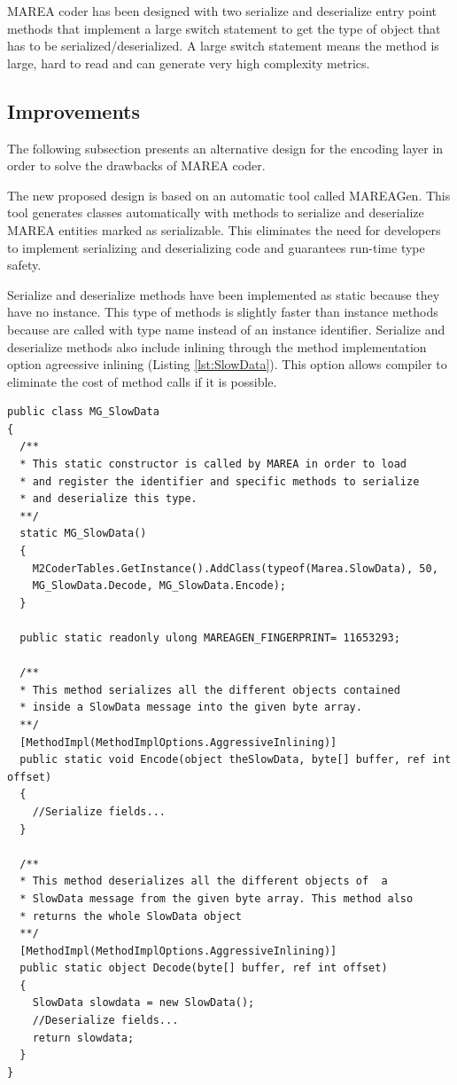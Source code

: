 MAREA coder has been designed with two serialize and deserialize entry point methods that implement a large switch statement to get the type of object that has to be serialized/deserialized. A large switch statement means the method is large, hard to read and can generate very high complexity metrics.

\subsection{Improvements}\label{SS:Encoding-Layer-Improvements}
The following subsection presents an alternative design for the encoding layer in order to solve the drawbacks of MAREA coder.  

The new proposed design is based on an automatic tool called MAREAGen. This tool generates classes automatically with methods to serialize and deserialize MAREA entities marked as serializable. This eliminates the need for developers to implement serializing and deserializing code and guarantees run-time type safety.

Serialize and deserialize methods have been implemented as static because they have no instance. This type of methods is slightly faster than instance methods because are called with type name instead of an instance identifier. Serialize and deserialize methods also include inlining through the method implementation option agreessive inlining (Listing \ref{lst:SlowData}). This option allows compiler to eliminate the cost of method calls if it is possible. 

\begin{lstlisting}[caption={Class to serialize/deserialize MAREA SlowData messages },label={lst:SlowData}]
public class MG_SlowData
{
  /**
  * This static constructor is called by MAREA in order to load 
  * and register the identifier and specific methods to serialize
  * and deserialize this type.
  **/
  static MG_SlowData()
  {
    M2CoderTables.GetInstance().AddClass(typeof(Marea.SlowData), 50,
    MG_SlowData.Decode, MG_SlowData.Encode);		
  }

  public static readonly ulong MAREAGEN_FINGERPRINT= 11653293;
  
  /**
  * This method serializes all the different objects contained
  * inside a SlowData message into the given byte array.
  **/
  [MethodImpl(MethodImplOptions.AggressiveInlining)]
  public static void Encode(object theSlowData, byte[] buffer, ref int offset)
  {
    //Serialize fields...
  }

  /**
  * This method deserializes all the different objects of  a
  * SlowData message from the given byte array. This method also
  * returns the whole SlowData object 
  **/
  [MethodImpl(MethodImplOptions.AggressiveInlining)]
  public static object Decode(byte[] buffer, ref int offset)
  {
    SlowData slowdata = new SlowData();
    //Deserialize fields...
    return slowdata;
  }
}
\end{lstlisting}

